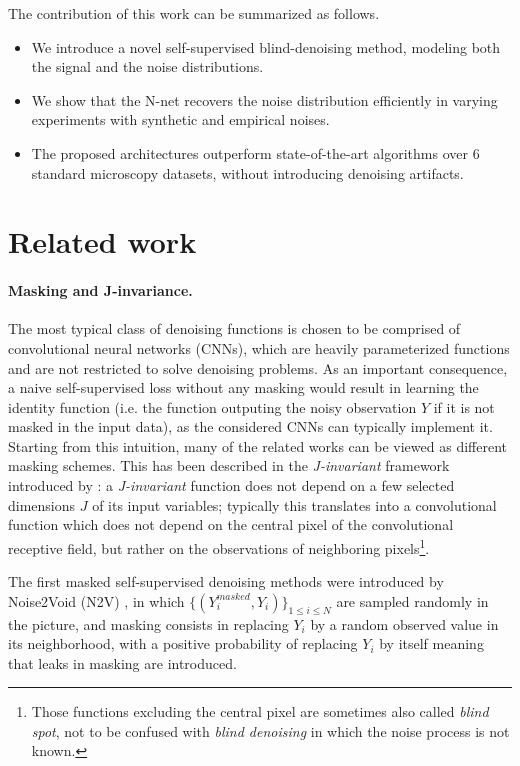 \documentclass{article}
\begin{document}
The contribution of this work can be summarized as follows.
\begin{itemize}
  \item We introduce a novel self-supervised blind-denoising method, modeling both the signal and the noise distributions.
  \item We show that the N-net recovers the noise distribution efficiently in varying experiments with synthetic and empirical noises.
  \item The proposed architectures outperform state-of-the-art algorithms over 6 standard microscopy datasets, without introducing denoising artifacts.
\end{itemize}

\section{Related work}
\label{sec:related}
\paragraph{Masking and J-invariance.}
The most typical class of denoising functions is chosen to be comprised of convolutional neural networks (CNNs), which are heavily parameterized functions and are not restricted to solve denoising problems. As an important consequence, a naive self-supervised loss without any masking would result in learning the identity function (i.e. the function outputing the noisy observation $Y$ if it is not masked in the input data), as the considered CNNs can typically implement it. Starting from this intuition, many of the related works can be viewed as different masking schemes. This has been described in the \textit{J-invariant} framework introduced by \cite{batson2019noise2self}: a \textit{J-invariant} function does not depend on a few selected dimensions $J$ of its input variables; typically this translates into a convolutional function which does not depend on the central pixel of the convolutional receptive field, but rather on the observations of neighboring pixels\footnote{Those functions excluding the central pixel are sometimes also called \textit{blind spot}, not to be confused with \textit{blind denoising} in which the noise process is not known.}.

The first masked self-supervised denoising methods were introduced by Noise2Void (N2V) \cite{krull2018noise2void}, in which $\{(Y^{masked}_i,Y_i)\}_{1\leqslant i\leqslant N}$ are sampled  randomly in the picture, and masking consists in replacing $Y_i$ by a random observed value in its neighborhood, with a positive probability of replacing $Y_i$ by itself meaning that leaks in masking are introduced.
\end{document}
